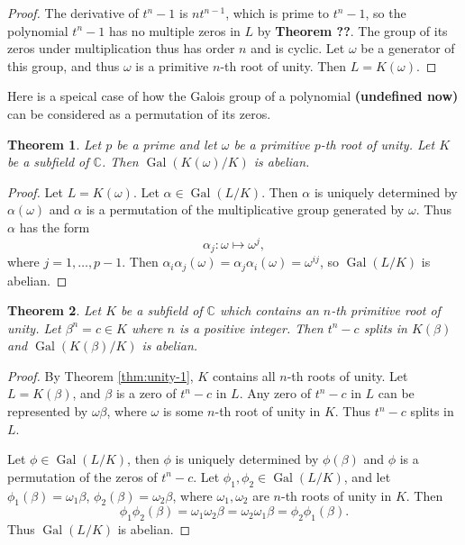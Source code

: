 \documentclass[12pt]{article}
\newtheorem{theorem}{Theorem}
\newcommand{\Gal}{\operatorname{Gal}}
\begin{document}
\begin{proof}
The derivative of $t^n-1$ is $n t^{n-1}$, which is prime to $t^n-1$, so the polynomial $t^n-1$ has no multiple zeros in $L$ by \textbf{Theorem ??}. The group of its zeros under multiplication thus has order $n$ and is cyclic. Let $\omega$ be a generator of this group, and thus $\omega$ is a primitive $n$-th root of unity. Then $L=K(\omega)$. 
\end{proof}

Here is a speical case of how the Galois group of a polynomial \textbf{(undefined now)} can be considered as a permutation of its zeros.


\begin{theorem} \label{thm:radical-1}
    Let $p$ be a prime and let $\omega$ be a primitive $p$-th root of unity. Let $K$ be a subfield of $\mathbb C$. Then $\Gal(K(\omega) / K)$ is abelian.
\end{theorem}
\begin{proof}
Let $L = K(\omega)$.  Let $\alpha \in \Gal(L / K)$. Then $\alpha$ is uniquely determined by $\alpha(\omega)$ and $\alpha$ is a permutation of the multiplicative group generated by $\omega$. Thus $\alpha$ has the form
$$
\alpha_j: \omega \mapsto \omega^j,
$$
where $j=1,\dots,p-1$. Then $\alpha_i \alpha_j (\omega) = \alpha_j \alpha_i (\omega) = \omega^{i j}$, so $ \Gal(L / K)$ is abelian.
\end{proof}

\begin{theorem} \label{thm:radical-2}
    Let $K$ be a subfield of $\mathbb{C}$ which contains an $n$-th primitive root of unity. Let $\beta^n = c \in K $ where $n$ is a positive integer. Then $t^n - c$ splits in $K(\beta)$ and $\Gal(K(\beta) / K)$ is abelian.
\end{theorem}

\begin{proof}
By Theorem \ref{thm:unity-1}, $K$ contains all $n$-th roots of unity. Let $L = K(\beta)$, and $\beta$ is a zero of $t^n-c$ in $L$. Any zero of $t^n-c$ in $L$ can be represented by $\omega \beta$, where $\omega$ is some $n$-th root of unity in $K$. Thus $t^n - c$ splits in $L$.  

Let $\phi \in \Gal(L / K)$, then $\phi$ is uniquely determined by $\phi(\beta)$ and $\phi$ is a permutation of the zeros of $t^n - c$. Let $\phi_1, \phi_2 \in \Gal(L / K)$, and let $\phi_1(\beta) = \omega_1\beta$, $\phi_2(\beta) = \omega_2\beta$, where $\omega_1, \omega_2$ are $n$-th roots of unity in $K$. Then
$$
\phi_1 \phi_2(\beta)=\omega_1 \omega_2 \beta=\omega_2 \omega_1  \beta=\phi_2 \phi_1(\beta).
$$
Thus $\Gal(L / K)$ is abelian.
\end{proof}
\end{document}
